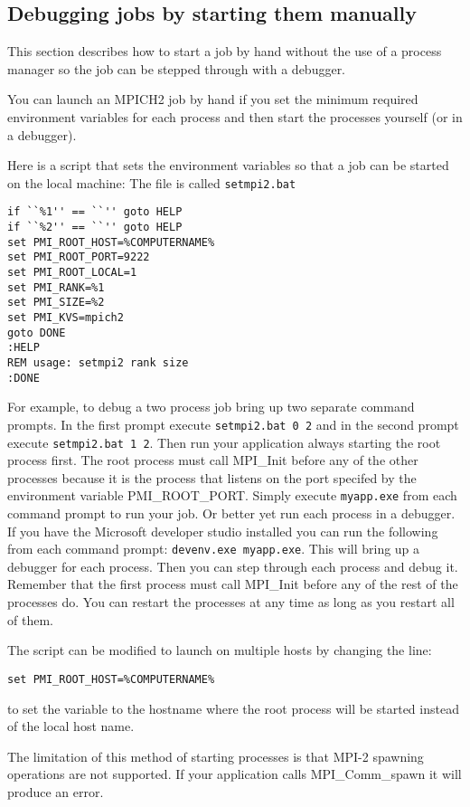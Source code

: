 \documentclass[dvipdfm,11pt]{article}
\begin{document}
\subsection{Debugging jobs by starting them manually}
This section describes how to start a job by hand without the use of a process
manager so the job can be stepped through with a debugger.

You can launch an MPICH2 job by hand if you set the minimum required environment
variables for each process and then start the processes yourself (or in a debugger).

Here is a script that sets the environment variables so that a job can be started
 on the local machine:
The file is called \texttt{setmpi2.bat}
\begin{verbatim}
if ``%1'' == ``'' goto HELP
if ``%2'' == ``'' goto HELP
set PMI_ROOT_HOST=%COMPUTERNAME%
set PMI_ROOT_PORT=9222
set PMI_ROOT_LOCAL=1
set PMI_RANK=%1
set PMI_SIZE=%2
set PMI_KVS=mpich2
goto DONE
:HELP
REM usage: setmpi2 rank size
:DONE
\end{verbatim}

For example, to debug a two process job bring up two separate command prompts.
In the first prompt execute \texttt{setmpi2.bat 0 2} and in the second prompt
execute \texttt{setmpi2.bat 1 2}.  Then run your application always starting
the root process first.  The root process must call MPI\_Init before any of the
other processes because it is the process that listens on the port specifed by
the environment variable PMI\_ROOT\_PORT.  Simply execute \texttt{myapp.exe} from
each command prompt to run your job.  Or better yet run each process in a debugger.
If you have the Microsoft developer studio installed you can run the following
from each command prompt: \texttt{devenv.exe myapp.exe}.  This will bring up a
debugger for each process.  Then you can step through each process and debug it.
Remember that the first process must call MPI\_Init before any of the rest of the
processes do.  You can restart the processes at any time as long as you restart
all of them.

The script can be modified to launch on multiple hosts by changing the line:
\begin{verbatim}
set PMI_ROOT_HOST=%COMPUTERNAME%
\end{verbatim}
to set the variable to the hostname where the root process will be started instead
of the local host name.

The limitation of this method of starting processes is that MPI-2 spawning operations
are not supported.  If your application calls MPI\_Comm\_spawn it will produce
an error.
\end{document}
